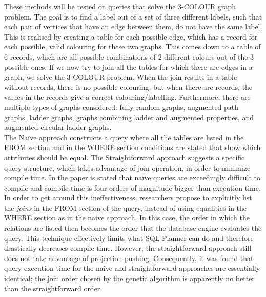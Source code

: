 These methods will be tested on queries that solve the 3-COLOUR graph problem. The goal is to find a label out of a set of three different labels, such that each pair of vertices that have an edge between them, do not have the same label. This is realised by creating a table for each possible edge, which has a record for each possible, valid colouring for these two graphs. This comes down to a table of 6 records, which are all possible combinations of 2 different colours out of the 3 possible ones. If we now try to join all the tables for which there are edges in a graph, we solve the 3-COLOUR problem. When the join results in a table without records, there is no possible colouring, but when there are records, the values in the records give a correct colouring/labelling. Furthermore, there are multiple types of graphs considered: fully random graphs, augmented path graphs, ladder graphs, graphs combining ladder and augmented properties, and augmented circular ladder graphs. \\

The Na\"ive approach constructs a query where all the tables are listed in the FROM section and in the WHERE section conditions are stated that show which attributes should be equal. The Straightforward approach suggests a specific query structure, which takes advantage of join operation, in order to minimize compile time. In the paper is stated that na\"ive queries are exceedingly difficult to compile and compile time is four orders of magnitude bigger than execution time. In order to get around this ineffectiveness, researchers propose to explicitly list the \textit{joins} in the FROM section of the query, instead of using equalities in the WHERE section as in the naive approach. In this case, the order in which the relations are listed then becomes the order that the database engine evaluates the query. This technique effectively limits what SQL Planner can do and therefore drastically decreases compile time. However, the straightforward approach still does not take advantage of projection pushing. Consequently, it was found that query execution time for the naive and straightforward approaches are essentially identical; the join order chosen by the genetic algorithm is apparently no better than the straightforward order. \\

